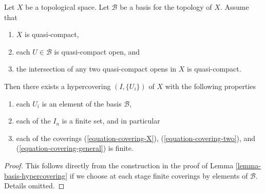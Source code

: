 \begin{lemma}
\label{lemma-quasi-separated-quasi-compact-hypercovering}
Let $X$ be a topological space.
Let $\mathcal{B}$ be a basis for the topology of $X$.
Assume that
\begin{enumerate}
\item $X$ is quasi-compact,
\item each $U \in \mathcal{B}$ is quasi-compact open, and
\item the intersection of any two quasi-compact opens in
$X$ is quasi-compact.
\end{enumerate}
Then there exists a hypercovering $(I, \{U_i\})$ of $X$ with the
following properties
\begin{enumerate}
\item each $U_i$ is an element of the basis $\mathcal{B}$,
\item each of the $I_n$ is a finite set, and in particular
\item each of the coverings  (\ref{equation-covering-X}),
(\ref{equation-covering-two}), and (\ref{equation-covering-general})
is finite.
\end{enumerate}
\end{lemma}

\begin{proof}
This follows directly from the construction in the proof of
Lemma \ref{lemma-basis-hypercovering} if we choose at each stage
finite coverings by elements of $\mathcal{B}$. Details omitted.
\end{proof}










